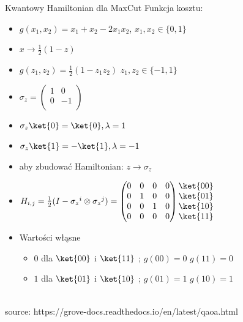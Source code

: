 \begin{frame}{Kwantowy Hamiltonian dla MaxCut}
Funkcja kosztu:
    \begin{itemize}
        \item[] $g(x_1, x_2)=x_1+x_2-2x_1 x_2$, $x_1,x_2 \in\{0,1\}$
        \item[] $x\rightarrow \frac{1}{2}(1-z)$  
        \item[] $g(z_1,z_2)=\frac{1}{2}(1-z_1z_2)$ $z_1,z_2 \in\{-1,1\}$
        \item[]
        $\sigma_z=\begin{pmatrix}  
    1 &0\\
    0 & -1\\
    \end{pmatrix}$
        \item[] $\sigma_z\ket{0}=\ket{0}, \lambda=1$
       \item[] $\sigma_z\ket{1}=-\ket{1}, \lambda=-1$
       \item[] aby zbudować Hamiltonian: $z\rightarrow \sigma_z$
        \item[] $H_{i,j}=\frac{1}{2}(I-{\sigma_z}^i\otimes {\sigma_z}^j)=\begin{pmatrix}  
    0 &0&0&0\\
     0 &1&0&0\\
      0 &0&1&0\\
       0 &0&0&0
    \end{pmatrix} \begin{matrix}
    \ket{00}\\
     \ket{01}\\
      \ket{10}\\
       \ket{11}\\
    \end{matrix}$
        \item[]Wartości włąsne
        \begin{itemize}
            \item $0$ dla $\ket{00}$ i $\ket{11}$ ; $g(00)=0$ $g(11)=0$
             \item $1$ dla $\ket{01}$ i $\ket{10}$ ; $g(01)=1$ $g(10)=1$
        \end{itemize}
    \end{itemize}
    \\
    \small{source: https://grove-docs.readthedocs.io/en/latest/qaoa.html}
\end{frame}
